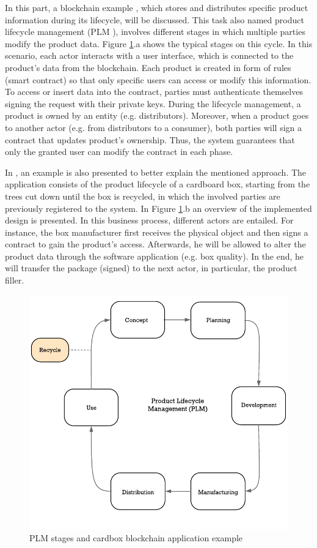 In this part, a blockchain example \citep{abeyratne2016blockchain}, which stores and distributes specific product information during its lifecycle, will be discussed. This task also named product lifecycle management (PLM \citep{stark2015product}), involves different stages in which multiple parties modify the product data. Figure \ref{fig:supplyChain}.a shows the typical stages on this cycle. In this scenario, each actor interacts with a user interface, which is connected to the product's data from the blockchain. Each product is created in form of rules (smart contract) so that only specific users can access or modify this information. To access or insert data into the contract, parties must authenticate themselves signing the request with their private keys. During the lifecycle management, a product is owned by an entity (e.g. distributors). Moreover, when a product goes to another actor (e.g. from distributors to a consumer), both parties will sign a contract that updates product's ownership. Thus, the system guarantees that only the granted user can modify the contract in each phase.

In \citep{abeyratne2016blockchain}, an example is also presented to better explain the mentioned approach. The application consists of the product lifecycle of a cardboard box, starting from the trees cut down until the box is recycled, in which the involved parties are previously registered to the system. In Figure \ref{fig:supplyChain}.b an overview of the implemented design is presented. In this business process, different actors are entailed. For instance, the box manufacturer first receives the physical object and then signs a contract to gain the product's access. Afterwards, he will be allowed to alter the product data through the software application (e.g. box quality). In the end, he will transfer the package (signed) to the next actor, in particular, the product filler.

\begin{figure}
	\centering
	\includegraphics[width=0.9\linewidth]{gfx/supplyChain}    
  \caption{ PLM stages and cardbox blockchain application example \citep{stark2015product}}
  \label{fig:supplyChain}
\end{figure}

